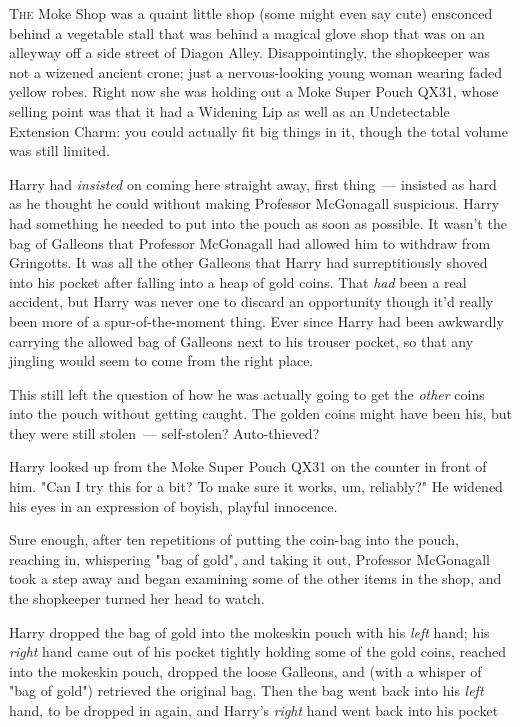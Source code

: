 
\lettrine{T}{he} Moke Shop was a quaint little shop (some might even say cute) ensconced
behind a vegetable stall that was behind a magical glove shop that was on an
alleyway off a side street of Diagon Alley. Disappointingly, the shopkeeper was
not a wizened ancient crone; just a nervous-looking young woman wearing faded
yellow robes. Right now she was holding out a Moke Super Pouch QX31, whose
selling point was that it had a Widening Lip as well as an Undetectable
Extension Charm: you could actually fit big things in it, though the total
volume was still limited.

Harry had \emph{insisted} on coming here straight away, first thing~--- insisted
as hard as he thought he could without making Professor McGonagall suspicious.
Harry had something he needed to put into the pouch as soon as possible. It
wasn't the bag of Galleons that Professor McGonagall had allowed him to
withdraw from Gringotts. It was all the other Galleons that Harry had
surreptitiously shoved into his pocket after falling into a heap of gold coins.
That \emph{had} been a real accident, but Harry was never one to discard an
opportunity{\el} though it'd really been more of a spur-of-the-moment thing.
Ever since Harry had been awkwardly carrying the allowed bag of Galleons next
to his trouser pocket, so that any jingling would seem to come from the right
place.

This still left the question of how he was actually going to get the
\emph{other} coins into the pouch without getting caught. The golden coins
might have been his, but they were still stolen~--- self-stolen? Auto-thieved?

Harry looked up from the Moke Super Pouch QX31 on the counter in front of him.
"Can I try this for a bit? To make sure it works, um, reliably?" He widened his
eyes in an expression of boyish, playful innocence.

Sure enough, after ten repetitions of putting the coin-bag into the pouch,
reaching in, whispering "bag of gold", and taking it out, Professor McGonagall
took a step away and began examining some of the other items in the shop, and
the shopkeeper turned her head to watch.

Harry dropped the bag of gold into the mokeskin pouch with his \emph{left}
hand; his \emph{right} hand came out of his pocket tightly holding some of the
gold coins, reached into the mokeskin pouch, dropped the loose Galleons, and
(with a whisper of "bag of gold") retrieved the original bag. Then the bag went
back into his \emph{left} hand, to be dropped in again, and Harry's
\emph{right} hand went back into his pocket{\el}

